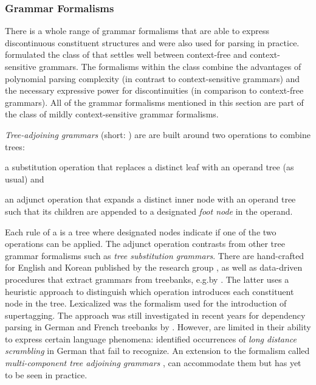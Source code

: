 \documentclass[../document.tex]{subfiles}
\begin{document}
    \subsubsection*{Grammar Formalisms}
    There is a whole range of grammar formalisms that are able to express discontinuous constituent structures and were also used for parsing in practice.
    \citet{VijWeiJos87,Weir88} formulated the class of  that settles well between context-free and context-sensitive grammars.
    The formalisms within the class combine the advantages of polynomial parsing complexity (in contrast to context-sensitive grammars) and the necessary expressive power for discontinuities (in comparison to context-free grammars).
    All of the grammar formalisms mentioned in this section are part of the class of mildly context-sensitive grammar formalisms.

    \emph{Tree-adjoining grammars} (short: ) \citep{JosLevTak75} are are built around two operations to combine trees:
    \begin{compactitem}
        \item a substitution operation that replaces a distinct leaf with an operand tree (as usual) and
        \item an adjunct operation that expands a distinct inner node with an operand tree such that its children are appended to a designated \emph{foot node} in the operand.
    \end{compactitem}
    Each rule of a  is a tree where designated nodes indicate if one of the two operations can be applied.
    The adjunct operation contrasts  from other tree grammar formalisms such as \emph{tree substitution grammars}.
    There are hand-crafted  for English \citep{xtag01} and Korean \citep{xtag02} published by the  research group \citep{Doran99}, as well as data-driven procedures that extract grammars from treebanks, e.g.\@ by \citet{xia1999extracting,Bla18}.
    The latter uses a heuristic approach to distinguish which operation introduces each constituent node in the tree.
    Lexicalized  was the formalism used for the introduction of supertagging. \citep{bangalore1999supertagging}
    The approach was still investigated in recent years for dependency parsing in German and French treebanks by \citet{Kas17,Bla18}.
    However,  are limited in their ability to express certain language phenomena: \citet{Becker91} identified occurrences of \emph{long distance scrambling} in German that  fail to recognize.
    An extension to the formalism called \emph{multi-component tree adjoining grammars} \citep{VijWeiJos87,Weir88}, can accommodate them but has yet to be seen in practice.
\end{document}
